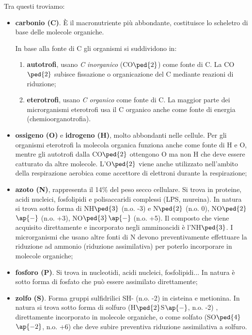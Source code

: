\documentclass[11pt]{book}
\begin{document}
Tra questi troviamo:
\begin{itemize}
\item \textbf{carbonio (C)}. \`E il macronutriente più abbondante, costituisce lo scheletro di base delle molecole organiche.

In base alla fonte di C gli organismi si suddividono in:
\begin{enumerate}
\item \textbf{autotrofi}, usano \emph{C inorganico} (CO$\ped{2}$) come fonte di C. La CO$\ped{2}$ subisce fissazione o organicazione del C mediante reazioni di riduzione;
\item \textbf{eterotrofi}, usano \emph{C organico }come fonte di C. La maggior parte dei microrganismi eterotrofi usa il C organico anche come fonte di energia (chemioorganotrofia).
\end{enumerate}

\item \textbf{ossigeno (O)} e \textbf{idrogeno (H)}, molto abbondanti nelle cellule. Per gli organismi eterotrofi la molecola organica funziona anche come fonte di H e O, mentre gli autotrofi dalla CO$\ped{2}$ ottengono O ma
non H che deve essere catturato da altre molecole. L’O$\ped{2}$ viene anche utilizzato nell’ambito della respirazione aerobica come accettore di elettroni durante la respirazione;
\item \textbf{azoto (N)}, rappresenta il 14$\%$ del peso secco cellulare. Si trova in proteine, acidi nucleici, fosfolipidi e polisaccaridi complessi (LPS, mureina). In natura si trova sotto forma di NH$\ped{3}$ (n.o. -3) e N$\ped{2}$ (n.o. 0), NO$\ped{2}$$\ap{-}$ (n.o. +3), NO$\ped{3}$$\ap{-}$ (n.o. +5). Il composto che viene acquisito direttamente e incorporato negli amminoacidi è l’NH$\ped{3}$. I microrganismi che usano altre fonti di N devono preventivamente effettuare la riduzione ad ammonio (riduzione assimilativa) per poterlo incorporare in molecole organiche;
\item \textbf{fosforo (P)}. Si trova in nucleotidi, acidi nucleici, fosfolipidi... In natura è sotto forma di fosfato che può essere assimilato direttamente;
\item \textbf{zolfo (S)}. Forma gruppi sulfidrilici SH- (n.o. -2) in cisteina e metionina. In natura si trova sotto forma di solfuro (H$\ped{2}$S$\ap{-}$, n.o. -2) , direttamente incorporato in molecole organiche, o come solfato (SO$\ped{4}$$\ap{-2}$, n.o. +6) che deve subire preventiva riduzione assimilativa a solfuro.
\end{itemize}
\end{document}
